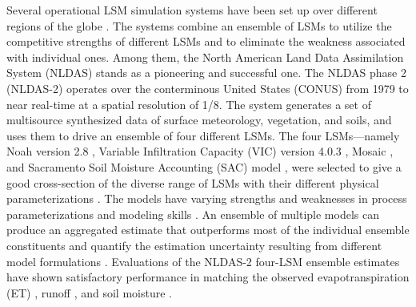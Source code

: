 \documentclass[essd, manuscript]{copernicus}
\begin{document}
Several operational LSM simulation systems have been set up over different regions of the globe \citep{xia2019JMR, shi2011SCES, carrera2015JH, rodell2004BAMS}. The systems combine an ensemble of LSMs to utilize the competitive strengths of different LSMs and to eliminate the weakness associated with individual ones. Among them, the North American Land Data Assimilation System (NLDAS) \citep{xia2012JGRAa, xia2012JGRA, mitchell2004JGRA} stands as a pioneering and successful one. The NLDAS phase 2 (NLDAS-2) operates over the conterminous United States (CONUS) from 1979 to near real-time at a spatial resolution of 1/8\degree{}. The system generates a set of multisource synthesized data of surface meteorology, vegetation, and soils, and uses them to drive an ensemble of four different LSMs. The four LSMs---namely Noah version 2.8 \citep{ek2003JGRA, chen2001MWR, chen2001MWRa, chen1997BM}, Variable Infiltration Capacity (VIC) version 4.0.3 \citep{liang1994JGRA}, Mosaic \citep{koster1992JGRA}, and Sacramento Soil Moisture Accounting (SAC) model \citep{burnash1973}, were selected to give a good cross-section of the diverse range of LSMs with their different physical parameterizations \citep{mitchell2004JGRA}. The models have varying strengths and weaknesses in process parameterizations and modeling skills \citep{kumar2017WRR}. An ensemble of multiple models can produce an aggregated estimate that outperforms most of the individual ensemble constituents \citep{fei2021WRR, beck2017HESS, guo2007QJRMS, ajami2007WRR} and quantify the estimation uncertainty resulting from different model formulations \citep{troin2021WRR, cloke2009JH}. Evaluations of the NLDAS-2 four-LSM ensemble estimates have shown satisfactory performance in matching the observed evapotranspiration (ET) \citep{zhang2020AFM, xia2012JGRA, kumar2018RS}, runoff \citep{xia2012JGRAa}, and soil moisture \citep{xia2015JHa, xia2015JH}.
\end{document}

